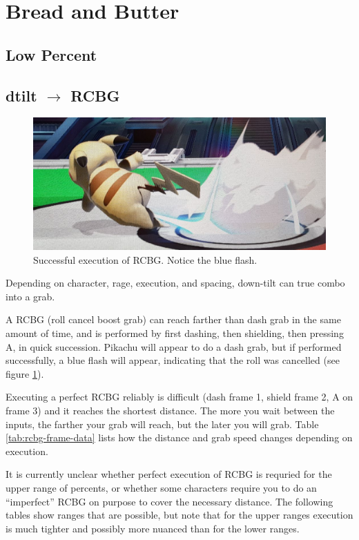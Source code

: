 \section{Bread and Butter}
\label{sec:bnb}

\subsection{Low Percent}

\clearpage
\subsection{dtilt $\rightarrow$ RCBG}

\begin{figure}[h]
    \centering
    \includegraphics[width=.6\linewidth]{images/pika-rcbg}
    \caption{Successful execution of RCBG. Notice the blue flash.}
    \label{fig:pika-rcbg}
\end{figure}

Depending on character, rage, execution, and spacing, down-tilt can true combo
into a grab.

A RCBG (roll cancel boost grab) can  reach  farther than dash grab in the same
amount of time, and is  performed  by  first  dashing,  then  shielding,  then
pressing A, in quick succession. Pikachu will appear to do a dash grab, but if
performed successfully, a blue flash will appear, indicating that the roll was
cancelled (see figure \ref{fig:pika-rcbg}).


Executing  a perfect RCBG reliably is difficult (dash frame 1, shield frame 2,
A on frame 3) and it reaches the shortest distance. The more you wait  between
the inputs, the farther your grab will  reach,  but  the  later you will grab.
Table \ref{tab:rcbg-frame-data} lists how the distance and grab speed  changes
depending on execution.

It is currently unclear whether perfect  execution of RCBG is requried for the
upper  range  of  percents,  or whether some characters require you to  do  an
``imperfect'' RCBG  on  purpose to cover the necessary distance. The following
tables  show  ranges  that are possible, but note that for  the  upper  ranges
execution is much tighter and possibly more nuanced than for the lower ranges.

